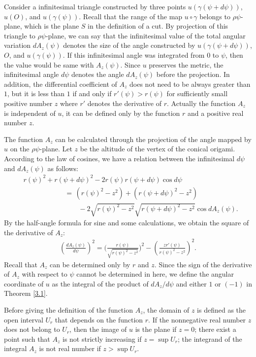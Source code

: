 \documentclass{amsart}
\theoremstyle{plain}
\theoremstyle{definition}
\theoremstyle{remark}
\begin{document}
Consider a infinitesimal triangle constructed by three points $u(\gamma(\psi+d\psi))$, $u(O)$, and $u(\gamma(\psi))$.
Recall that the range of the map $u\circ\gamma$ belongs to $\rho\psi$-plane, which is the plane $S$ in the definition of a cut.
By projection of this triangle to $\rho\psi$-plane, we can say that the infinitesimal value of the total angular variation $dA_z(\psi)$ denotes the size of the angle constructed by $u(\gamma(\psi+d\psi))$, $O$, and $u(\gamma(\psi))$.
If this infinitesimal angle was integrated from $0$ to $\psi$, then the value would be same with $A_z(\psi)$.
Since $u$ preserves the metric, the infinitesimal angle $d\psi$ denotes the angle $dA_z(\psi)$ before the projection.
In addition, the differential coefficient of $A_z$ does not need to be always greater than $1$, but it is less than $1$ if and only if $r'(\psi)>r(\psi)$ for sufficiently small positive number $z$ where $r'$ denotes the derivative of $r$.
Actually the function $A_z$ is independent of $u$, it can be defined only by the function $r$ and a positive real number $z$.

The function $A_z$ can be calculated through the projection of the angle mapped by $u$ on the $\rho\psi$-plane.
Let $z$ be the altitude of the vertex of the conical origami.
According to the law of cosines, we have a relation between the infinitesimal $d\psi$ and $dA_z(\psi)$ as follows:
\begin{align*}
&r(\psi)^2+r(\psi+d\psi)^2-2r(\psi)r(\psi+d\psi)\cos d\psi\,
\\&\qquad\qquad\qquad=\,\left(r(\psi)^2-z^2\right)+\left(r(\psi+d\psi)^2-z^2\right)
\\&\qquad\qquad\qquad\qquad-2\sqrt{r(\psi)^2-z^2}\sqrt{r(\psi+d\psi)^2-z^2}\cos dA_z(\psi).
\end{align*}
By the half-angle formula for sine and some calculations, we obtain the square of the derivative of $A_z$:
\begin{align*}
\left(\frac{dA_z(\psi)}{d\psi}\right)^2=\biggl(\frac{r(\psi)}{\sqrt{r(\psi)^2-z^2}}\biggr)^2-\left(\frac{zr'(\psi)}{r(\psi)^2-z^2}\right)^2.
\end{align*}
Recall that $A_z$ can be determined only by $r$ and $z$.
Since the sign of the derivative of $A_z$ with respect to $\psi$ cannot be determined in here, we define the angular coordinate of $u$ as the integral of the product of $dA_z/d\psi$ and either $1$ or $(-1)$ in Theorem \ref{3.1}.

Before giving the definition of the function $A_z$, the domain of $z$ is defined as the open interval $U_r$ that depends on the function $r$. 
If the nonnegative real number $z$ does not belong to $U_r$, then the image of $u$ is the plane if $z=0$; there exist a point such that $A_z$ is not strictly increasing if $z=\sup U_r$; the integrand of the integral $A_z$ is not real number if $z>\sup U_r$.
\end{document}
